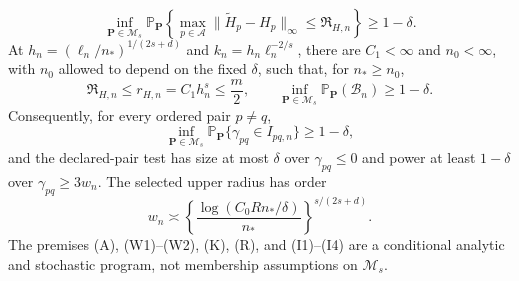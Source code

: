 \[
 \inf_{\mathbf P\in\mathcal M_s}
 \mathbb P_{\mathbf P}\!\left\{
 \max_{p\in\mathcal A}\lVert\widetilde H_p-H_p\rVert_\infty
 \le\mathfrak R_{H,n}\right\}\ge1-\delta.
 \tag{B1}
\]
At \(h_n=(\ell_n/n_\ast)^{1/(2s+d)}\) and \(k_n=h_n\ell_n^{-2/s}\), there are \(C_1<\infty\) and \(n_0<\infty\), with \(n_0\) allowed to depend on the fixed \(\delta\), such that, for \(n_\ast\ge n_0\),
\[
 \mathfrak R_{H,n}\le r_{H,n}=C_1h_n^s\le\frac m2,
 \qquad
 \inf_{\mathbf P\in\mathcal M_s}\mathbb P_{\mathbf P}(\mathcal B_n)\ge1-\delta.
 \tag{B2}
\]
Consequently, for every ordered pair \(p\ne q\),
\[
 \inf_{\mathbf P\in\mathcal M_s}
 \mathbb P_{\mathbf P}\{\gamma_{pq}\in I_{pq,n}\}\ge1-\delta,
\]
and the declared-pair test has size at most \(\delta\) over \(\gamma_{pq}\le0\) and power at least \(1-\delta\) over \(\gamma_{pq}\ge3w_n\).  The selected upper radius has order
\[
 w_n\asymp
 \left\{\frac{\log(C_0Rn_\ast/\delta)}{n_\ast}\right\}^{s/(2s+d)}.
\]
The premises (A), (W1)--(W2), (K), (R), and (I1)--(I4) are a conditional analytic and stochastic program, not membership assumptions on \(\mathcal M_s\).

